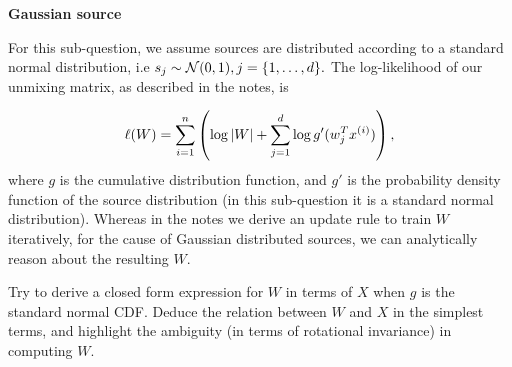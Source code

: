 \item {} \textbf{Gaussian source}

For this sub-question, we assume sources are distributed according to a standard normal distribution, i.e $s_j \sim \mathcal{N}(0,1), j=\{1,\ldots,{d}\}.$ The log-likelihood of our unmixing matrix, as described in the notes, is

$$\ell(W) = \sum_{i=1}^{n}\left(\log|W| + \sum_{j=1}^{d} \log g'(w_j^Tx^{(i)})\right),$$ where $g$ is the cumulative distribution function, and $g'$ is the probability density function of the source distribution (in this sub-question it is a standard normal distribution). Whereas in the notes we derive an update rule to train $W$ iteratively, for the cause of Gaussian distributed sources, we can analytically reason about the resulting $W$.

Try to derive a closed form expression for $W$ in terms of $X$ when $g$ is the standard normal CDF. Deduce the relation between $W$ and $X$ in the simplest terms, and highlight the ambiguity (in terms of rotational invariance) in computing $W$.

